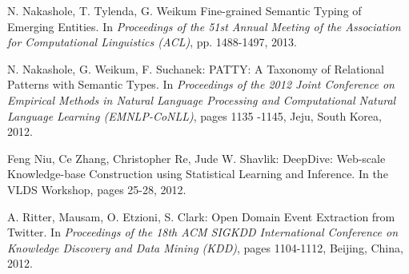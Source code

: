 \documentclass[11pt,a4paper]{article}
\begin{document}
\begin{thebibliography}{99}
 N. Nakashole, T. Tylenda, G. Weikum
		 Fine-grained Semantic Typing of Emerging Entities. In \textit{Proceedings of the 51st Annual Meeting of the Association for Computational Linguistics (ACL)}, pp. 1488-1497, 2013.
		 
 N. Nakashole, G. Weikum, F. Suchanek: PATTY:  A Taxonomy of Relational Patterns with Semantic Types.
		In \textit{Proceedings of the 2012 Joint Conference on Empirical Methods
               in Natural Language Processing and Computational Natural
               Language Learning (EMNLP-CoNLL)}, pages 1135 -1145, Jeju, South Korea, 2012.
          
%
%
%
%
%
 
 Feng Niu, Ce Zhang, Christopher Re, Jude W. Shavlik: DeepDive: Web-scale Knowledge-base Construction using Statistical Learning and Inference. In  the VLDS Workshop, pages 25-28, 2012.


 A. Ritter, Mausam, O. Etzioni, S. Clark: Open Domain Event Extraction from Twitter.  In \textit{Proceedings of the 18th ACM SIGKDD International Conference on Knowledge
               Discovery and Data Mining (KDD)}, pages 1104-1112, Beijing, China, 2012.
               

\end{thebibliography}
\end{document}
